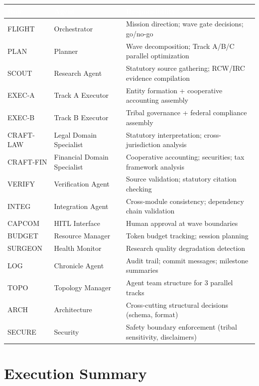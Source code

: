 \documentclass[11pt,letterpaper]{article}
\newcommand{\tableheader}[1]{\textbf{\sffamily\textcolor{white}{#1}}}
\begin{document}
\begin{center}
\begin{tabularx}{\textwidth}{L{2cm}L{3cm}X}
\toprule
{}
\tableheader{Role} & \tableheader{Agent} & \tableheader{Responsibility} \\
\midrule
FLIGHT & Orchestrator & Mission direction; wave gate decisions; go/no-go \\
PLAN & Planner & Wave decomposition; Track A/B/C parallel optimization \\
SCOUT & Research Agent & Statutory source gathering; RCW/IRC evidence compilation \\
EXEC-A & Track A Executor & Entity formation + cooperative accounting assembly \\
EXEC-B & Track B Executor & Tribal governance + federal compliance assembly \\
CRAFT-LAW & Legal Domain Specialist & Statutory interpretation; cross-jurisdiction analysis \\
CRAFT-FIN & Financial Domain Specialist & Cooperative accounting; securities; tax framework analysis \\
VERIFY & Verification Agent & Source validation; statutory citation checking \\
INTEG & Integration Agent & Cross-module consistency; dependency chain validation \\
CAPCOM & HITL Interface & Human approval at wave boundaries \\
BUDGET & Resource Manager & Token budget tracking; session planning \\
SURGEON & Health Monitor & Research quality degradation detection \\
LOG & Chronicle Agent & Audit trail; commit messages; milestone summaries \\
TOPO & Topology Manager & Agent team structure for 3 parallel tracks \\
ARCH & Architecture & Cross-cutting structural decisions (schema, format) \\
SECURE & Security & Safety boundary enforcement (tribal sensitivity, disclaimers) \\
\bottomrule
\end{tabularx}
\end{center}

\section{Execution Summary}
\end{document}
